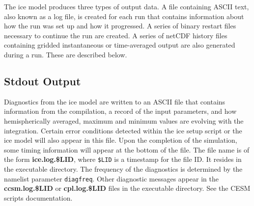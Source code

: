 
The ice model produces three types of output data.  A file containing
ASCII text, also known as a log file, is created for each run that
contains information about how the run was set up and how it progressed.
A series of binary restart files necessary to continue the run are created.
A series of netCDF history files containing gridded instantaneous or
time-averaged output are also generated during a run.  These are described below. 


\subsection{Stdout Output}
\label{stdout}

Diagnostics from the ice model are written to an ASCII file that contains
information from the compilation, a record
of the input parameters, and how hemispherically averaged, maximum and minimum
values are evolving with the integration.  Certain error conditions detected
within the ice setup script or the ice model will also appear in this file.
Upon the completion of the simulation, some timing information will appear
at the bottom of the file.
The file name is of the form {\bf ice.log.\$LID}, where \texttt{\$LID} is
a timestamp for the file ID. It resides in the executable directory.
The frequency of the diagnostics is determined by the namelist parameter
\texttt{diagfreq}. Other diagnostic messages appear in the {\bf ccsm.log.\$LID}
or {\bf cpl.log.\$LID} files in the executable directory. See the CESM scripts
documentation.

